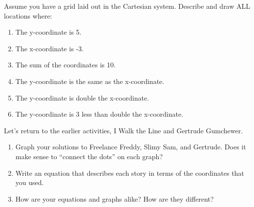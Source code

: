 \documentclass[nooutcomes,noauthor,handout] {ximera}
\begin{document}
\pagebreak

\begin{problem}
Assume you have a grid laid out in the Cartesian system.  Describe and draw ALL locations where:
\begin{enumerate}
\item The y-coordinate is 5.
\item The x-coordinate is -3.
\item The sum of the coordinates is 10.
\item The y-coordinate is the same as the x-coordinate.
\item The y-coordinate is double the x-coordinate.
\item The y-coordinate is 3 less than double the x-coordinate.
\end{enumerate}

\end{problem}


\begin{problem}
Let's return to the earlier activities, I Walk the Line and Gertrude Gumchewer.
    \begin{enumerate}
        \item Graph your solutions to Freelance Freddy, Slimy Sam, and Gertrude.  Does it make sense to ``connect the dots'' on each graph?
        \item Write an equation that describes each story in terms of the coordinates that you used.
        \item How are your equations and graphs alike? How are they different?
    \end{enumerate}    

\end{problem}
\end{document}
